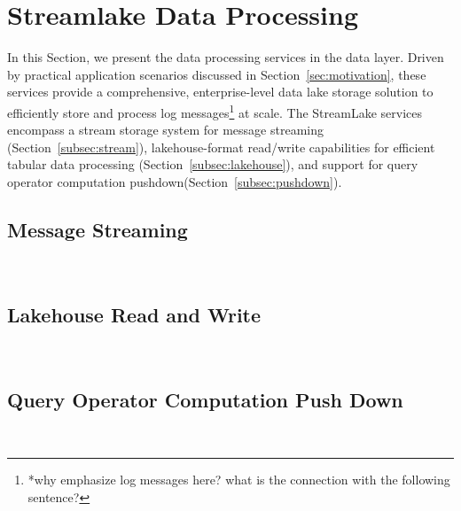 \section{Streamlake Data Processing} 
\label{sec:dataeva}

In this Section, we present the data processing services  in the data layer. Driven by practical application scenarios discussed in Section~\ref{sec:motivation}, these services provide a comprehensive, enterprise-level data lake storage solution  to efficiently store and process  log messages\footnote{*why emphasize log messages here? what is the connection with the following sentence?} at scale. The StreamLake services encompass a stream storage system for message streaming (Section~\ref{subsec:stream}), lakehouse-format read/write capabilities for efficient tabular data processing (Section~\ref{subsec:lakehouse}), and support for query operator computation pushdown(Section~\ref{subsec:pushdown}).


\subsection{Message Streaming}~\label{subsec:stream}


\subsection{Lakehouse Read and Write}~\label{subsec:lakehouse}


\subsection{Query Operator Computation Push Down}~\label{subsec:pushdown}